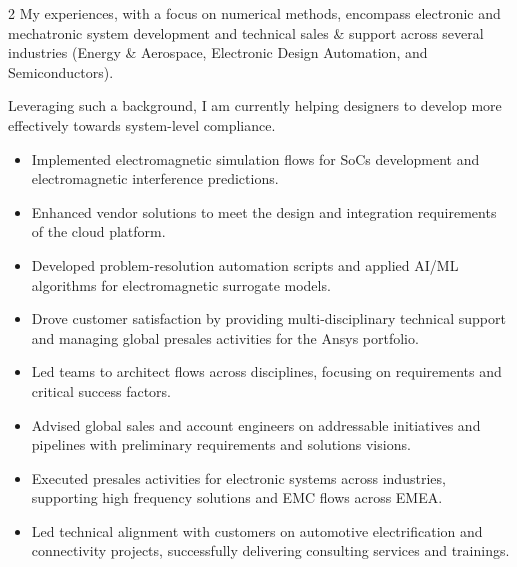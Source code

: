 \documentclass[9.5pt,a4paper,ragged2e,withhyper]{altacv} %
\begin{document}
\begin{paracol}{2}
My experiences, with a focus on numerical methods, encompass electronic and
mechatronic system development and technical sales \& support across several
industries (Energy \& Aerospace, Electronic Design Automation, and Semiconductors).

\medskip

Leveraging such a background, I am currently helping designers to develop more
effectively towards system-level compliance.


\begin{itemize}
\item Implemented electromagnetic simulation flows for SoCs development and electromagnetic interference
predictions.
\item Enhanced vendor solutions to meet the design and integration requirements of the cloud platform.
\item Developed problem-resolution automation scripts and applied AI/ML algorithms for
electromagnetic surrogate models.
\end{itemize}
\divider

\begin{itemize}
\item Drove customer satisfaction by providing multi-disciplinary technical support and
managing global presales activities for the Ansys portfolio.
\item Led teams to architect flows across disciplines, focusing on requirements and
critical success factors.
\item Advised global sales and account engineers on addressable initiatives and pipelines
with preliminary requirements and solutions visions.
\end{itemize}
\divider

\begin{itemize}
\item Executed presales activities for electronic systems across industries, supporting
high frequency solutions and EMC flows across EMEA.
\item Led technical alignment with customers on automotive electrification and
connectivity projects, successfully delivering consulting services and trainings.
\end{itemize}
\divider


\end{paracol}
\end{document}
